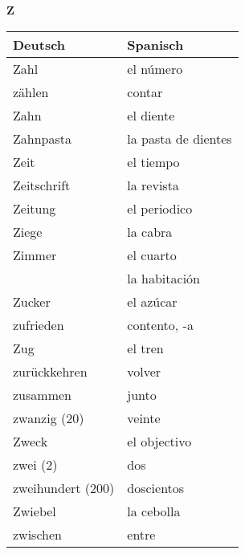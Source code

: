 \begin{flushright}\begin{Huge}\textbf{Z}\end{Huge}\end{flushright}

\begin{longtable}{p{} p{}} 
\textbf{Deutsch}     & \textbf{Spanisch}                                       \\ \hline
\hline
\endhead %
Zahl & el número \\
zählen & contar\\
Zahn & el diente\\
Zahnpasta & la pasta de dientes\\
Zeit & el tiempo\\
Zeitschrift & la revista\\
Zeitung & el periodico \\
Ziege & la cabra\\
Zimmer & el cuarto\\
~ & la habitación\\
Zucker & el azúcar\\
zufrieden & contento, -a\\
Zug & el tren\\
zurückkehren & volver\\
zusammen & junto\\
zwanzig (20) & veinte\\
Zweck & el objectivo\\
zwei (2) & dos\\
zweihundert (200) & doscientos\\
Zwiebel & la cebolla\\
zwischen & entre\\

\end{longtable}

